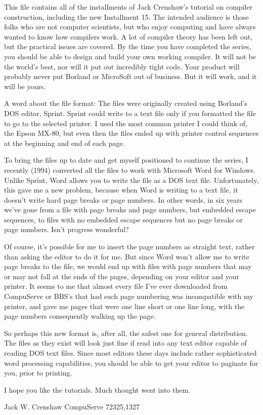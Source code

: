 \documentclass[float=false, crop=false]{standalone}
\begin{document}
This file contains all of the installments of Jack Crenshaw's tutorial on
compiler construction, including the new Installment 15. The intended audience
is those folks who are not computer scientists, but who enjoy computing and have
always wanted to know how compilers work. A lot of compiler theory has been left
out, but the practical issues are covered. By the time you have completed the
series, you should be able to design and build your own working compiler. It
will not be the world's best, nor will it put out incredibly tight code. Your
product will probably never put Borland or MicroSoft out of business. But it
will work, and it will be yours.

A word about the file format: The files were originally created using Borland's
DOS editor, Sprint. Sprint could write to a text file only if you formatted the
file to go to the selected printer. I used the most common printer I could think
of, the Epson MX-80, but even then the files ended up with printer control
sequences at the beginning and end of each page.

To bring the files up to date and get myself positioned to continue the series,
I recently (1994) converted all the files to work with Microsoft Word for
Windows. Unlike Sprint, Word allows you to write the file as a DOS text file.
Unfortunately, this gave me a new problem, because when Word is writing to a
text file, it doesn't write hard page breaks or page numbers. In other words, in
six years we've gone from a file with page breaks and page numbers, but embedded
escape sequences, to files with no embedded escape sequences but no page breaks
or page numbers. Isn't progress wonderful?

Of course, it's possible for me to insert the page numbers as straight text,
rather than asking the editor to do it for me. But since Word won't allow me to
write page breaks to the file, we would end up with files with page numbers that
may or may not fall at the ends of the pages, depending on your editor and your
printer. It seems to me that almost every file I've ever downloaded from
CompuServe or BBS's that had such page numbering was incompatible with my
printer, and gave me pages that were one line short or one line long, with the
page numbers consequently walking up the page.

So perhaps this new format is, after all, the safest one for general
distribution. The files as they exist will look just fine if read into any text
editor capable of reading DOS text files. Since most editors these days include
rather sophisticated word processing capabilities, you should be able to get
your editor to paginate for you, prior to printing.

I hope you like the tutorials. Much thought went into them.


									Jack W. Crenshaw
								CompuServe 72325,1327
\end{document}
